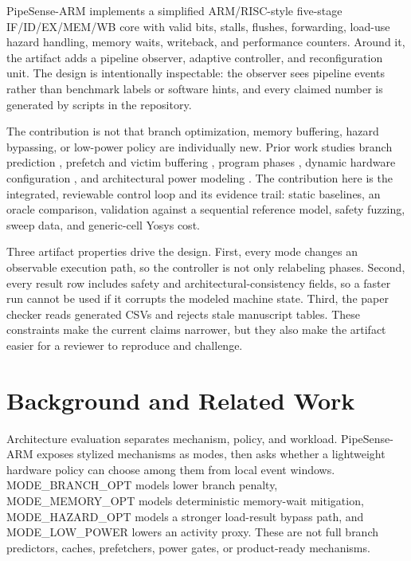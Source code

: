 \documentclass[conference]{IEEEtran}
\newcommand{\pipesense}{PipeSense-ARM}
\begin{document}
\pipesense{} implements a simplified ARM/RISC-style five-stage IF/ID/EX/MEM/WB core with valid bits, stalls, flushes, forwarding, load-use hazard handling, memory waits, writeback, and performance counters. Around it, the artifact adds a pipeline observer, adaptive controller, and reconfiguration unit. The design is intentionally inspectable: the observer sees pipeline events rather than benchmark labels or software hints, and every claimed number is generated by scripts in the repository.

The contribution is not that branch optimization, memory buffering, hazard bypassing, or low-power policy are individually new. Prior work studies branch prediction \cite{smith1981branch}, prefetch and victim buffering \cite{jouppi1990victim}, program phases \cite{sherwood2002phase}, dynamic hardware configuration \cite{dhodapkar2002working,balasubramonian2000memory}, and architectural power modeling \cite{brooks2000wattch,mudge2001power,isci2003runtime}. The contribution here is the integrated, reviewable control loop and its evidence trail: static baselines, an oracle comparison, validation against a sequential reference model, safety fuzzing, sweep data, and generic-cell Yosys cost.

Three artifact properties drive the design. First, every mode changes an observable execution path, so the controller is not only relabeling phases. Second, every result row includes safety and architectural-consistency fields, so a faster run cannot be used if it corrupts the modeled machine state. Third, the paper checker reads generated CSVs and rejects stale manuscript tables. These constraints make the current claims narrower, but they also make the artifact easier for a reviewer to reproduce and challenge.

\section{Background and Related Work}

Architecture evaluation separates mechanism, policy, and workload. \pipesense{} exposes stylized mechanisms as modes, then asks whether a lightweight hardware policy can choose among them from local event windows. MODE\_BRANCH\_OPT models lower branch penalty, MODE\_MEMORY\_OPT models deterministic memory-wait mitigation, MODE\_HAZARD\_OPT models a stronger load-result bypass path, and MODE\_LOW\_POWER lowers an activity proxy. These are not full branch predictors, caches, prefetchers, power gates, or product-ready mechanisms.
\end{document}
